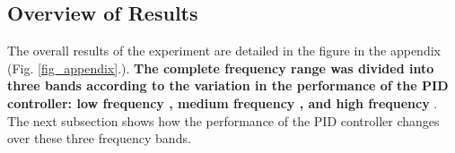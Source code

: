 \documentclass[conference]{IEEEtran}
\begin{document}
\subsection{Overview of Results}
\label{Overview of Results}
The overall results of the experiment are detailed in the figure in the appendix (Fig. \ref{fig_appendix}.). \textbf{The complete frequency range was divided into three bands according to the variation in the performance of the PID controller: low frequency , medium frequency , and high frequency }. The next subsection shows how the performance of the PID controller changes over these three frequency bands.
\end{document}
